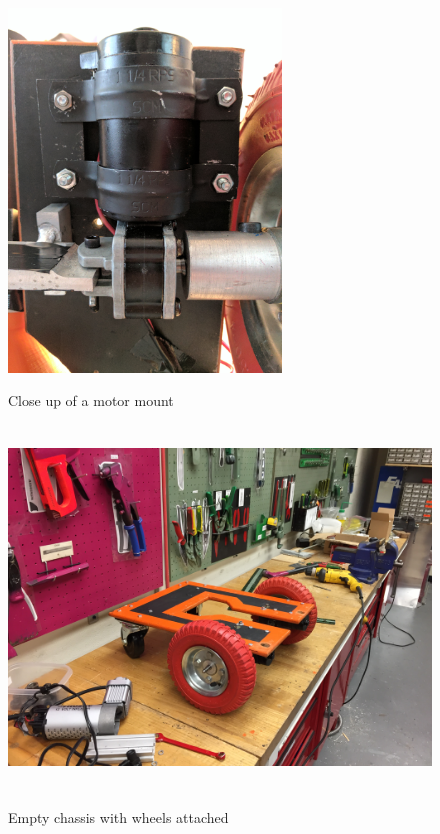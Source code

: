 \documentclass[12pt,letterpaper,titlepage]{article}
\begin{document}
\begin{figure}[H]
	\centering
	\includegraphics[height=3.8in]{images/mount}
	\label{fig:mount}
	\caption{Close up of a motor mount}
\end{figure}

\begin{figure}[H]
	\centering
	\includegraphics[height=3.8in]{images/image2}
	\label{fig:chassis}
	\caption{Empty chassis with wheels attached}
\end{figure}
\end{document}
